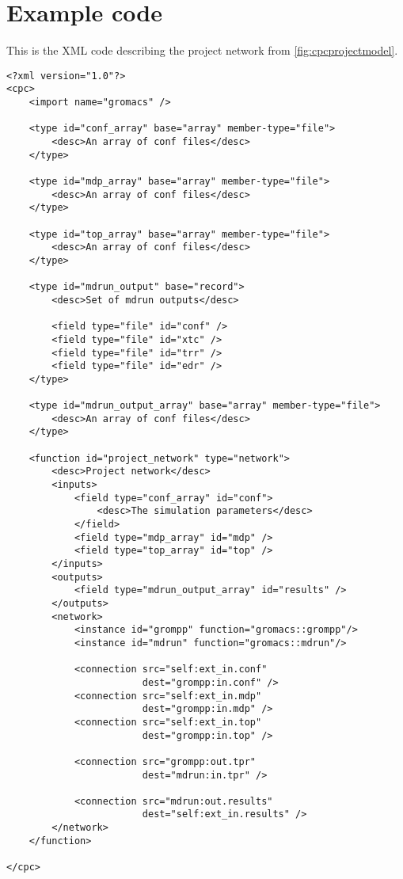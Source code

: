 \chapter{Example code}\label{ch:ec}
This is the XML code describing the project network from
\autoref{fig:cpcprojectmodel}.


\begin{verbatim}
<?xml version="1.0"?>
<cpc>
    <import name="gromacs" />

    <type id="conf_array" base="array" member-type="file">
        <desc>An array of conf files</desc>
    </type>

    <type id="mdp_array" base="array" member-type="file">
        <desc>An array of conf files</desc>
    </type>

    <type id="top_array" base="array" member-type="file">
        <desc>An array of conf files</desc>
    </type>

    <type id="mdrun_output" base="record">
        <desc>Set of mdrun outputs</desc>
        
        <field type="file" id="conf" />
        <field type="file" id="xtc" />
        <field type="file" id="trr" />
        <field type="file" id="edr" />
    </type>

    <type id="mdrun_output_array" base="array" member-type="file">
        <desc>An array of conf files</desc>
    </type>

    <function id="project_network" type="network">
        <desc>Project network</desc>
        <inputs>
            <field type="conf_array" id="conf">
                <desc>The simulation parameters</desc>
            </field>
            <field type="mdp_array" id="mdp" />
            <field type="top_array" id="top" />
        </inputs>
        <outputs>
            <field type="mdrun_output_array" id="results" />
        </outputs>
        <network>
            <instance id="grompp" function="gromacs::grompp"/>
            <instance id="mdrun" function="gromacs::mdrun"/>

            <connection src="self:ext_in.conf"
                        dest="grompp:in.conf" />
            <connection src="self:ext_in.mdp" 
                        dest="grompp:in.mdp" />
            <connection src="self:ext_in.top" 
                        dest="grompp:in.top" />

            <connection src="grompp:out.tpr"
                        dest="mdrun:in.tpr" />

            <connection src="mdrun:out.results"
                        dest="self:ext_in.results" />
        </network>
    </function>

</cpc>
\end{verbatim}
